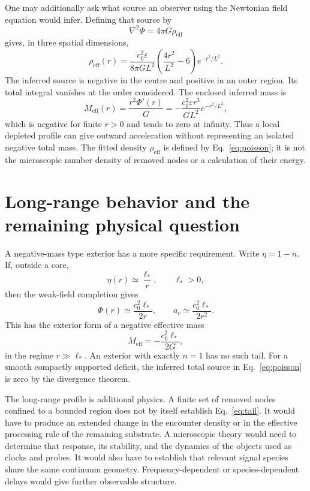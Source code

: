 \documentclass[aps,prd,reprint,nofootinbib]{revtex4-2}
\newcommand{\ve}{\varepsilon}
\newcommand{\reff}{\rho_{\mathrm{eff}}}
\newcommand{\Meff}{M_{\mathrm{eff}}}
\begin{document}
One may additionally ask what source an observer using the Newtonian
field equation would infer. Defining that source by
\begin{equation}
 \nabla^2\Phi=4\pi G\reff
 \label{eq:poisson}
\end{equation}
gives, in three spatial dimensions,
\begin{equation}
 \reff(r)=\frac{c_0^2\ve}{8\pi G L^2}
      \left(\frac{4r^2}{L^2}-6\right)e^{-r^2/L^2}.
 \label{eq:gaussrho}
\end{equation}
The inferred source is negative in the centre and positive in an outer
region. Its total integral vanishes at the order considered. The enclosed inferred
mass is
\begin{equation}
 \Meff(r)=\frac{r^2\Phi'(r)}{G}
       =-\frac{c_0^2\ve r^3}{G L^2}e^{-r^2/L^2},
 \label{eq:enclosed}
\end{equation}
which is negative for finite $r>0$ and tends to zero at infinity.
Thus a local depleted profile can give outward acceleration without
representing an isolated negative total mass. The fitted density
$\reff$ is defined by Eq.~\eqref{eq:poisson}; it is not the microscopic
number density of removed nodes or a calculation of their energy.

\section{Long-range behavior and the remaining physical question}
\label{sec:discussion}

A negative-mass type exterior has a more specific requirement. Write
$\eta=1-n$. If, outside a core,
\begin{equation}
 \eta(r)\simeq\frac{\ell_*}{r},\qquad \ell_*>0,
 \label{eq:tail}
\end{equation}
then the weak-field completion gives
\begin{equation}
 \Phi(r)\simeq\frac{c_0^2\ell_*}{2r},
 \qquad
 a_r\simeq\frac{c_0^2\ell_*}{2r^2}.
 \label{eq:inverse}
\end{equation}
This has the exterior form of a negative effective mass
\begin{equation}
 \Meff=-\frac{c_0^2\ell_*}{2G},
 \label{eq:negative}
\end{equation}
in the regime $r\gg\ell_*$. An exterior with exactly $n=1$ has no such
tail. For a smooth compactly supported deficit, the inferred total
source in Eq.~\eqref{eq:poisson} is zero by the divergence theorem.

The long-range profile is additional physics. A finite set of removed
nodes confined to a bounded region does not by itself establish
Eq.~\eqref{eq:tail}. It would have to produce an extended change in the
encounter density or in the effective processing rule of the remaining
substrate. A microscopic theory would need to determine that response,
its stability, and the dynamics of the objects used as clocks and
probes. It would also have to establish that relevant signal species
share the same continuum geometry. Frequency-dependent or
species-dependent delays would give further observable structure.
\end{document}
